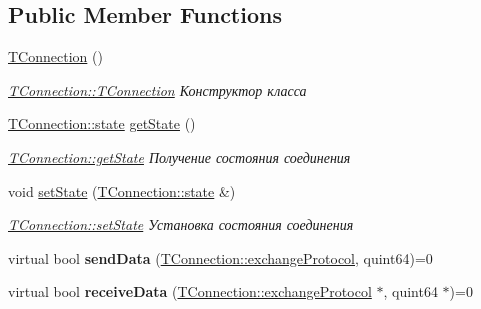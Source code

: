 \subsection*{Public Member Functions}
\begin{DoxyCompactItemize}
\item 
\mbox{\label{classconnection_1_1_t_connection_a2853c8ac857d43657d48c18ceeaef120}} 
\hyperlink{classconnection_1_1_t_connection_a2853c8ac857d43657d48c18ceeaef120}{T\+Connection} ()
\begin{DoxyCompactList}\small\item\em \hyperlink{classconnection_1_1_t_connection_a2853c8ac857d43657d48c18ceeaef120}{T\+Connection\+::\+T\+Connection} Конструктор класса \end{DoxyCompactList}\item 
\hyperlink{classconnection_1_1_t_connection_aee7dfb7510592bd2697ab6f906b9612c}{T\+Connection\+::state} \hyperlink{classconnection_1_1_t_connection_a7944d50c5733279cf0fdfd8c87c3b237}{get\+State} ()
\begin{DoxyCompactList}\small\item\em \hyperlink{classconnection_1_1_t_connection_a7944d50c5733279cf0fdfd8c87c3b237}{T\+Connection\+::get\+State} Получение состояния соединения \end{DoxyCompactList}\item 
void \hyperlink{classconnection_1_1_t_connection_af42c1674b7be3cf7be88806df013860e}{set\+State} (\hyperlink{classconnection_1_1_t_connection_aee7dfb7510592bd2697ab6f906b9612c}{T\+Connection\+::state} \&)
\begin{DoxyCompactList}\small\item\em \hyperlink{classconnection_1_1_t_connection_af42c1674b7be3cf7be88806df013860e}{T\+Connection\+::set\+State} Установка состояния соединения \end{DoxyCompactList}\item 
\mbox{\label{classconnection_1_1_t_connection_ae0cbb8d3bb954f20796d53c704a8359c}} 
virtual bool {\bfseries send\+Data} (\hyperlink{classconnection_1_1_t_connection_a3550181cb2fa72eccfa55d23f45cea34}{T\+Connection\+::exchange\+Protocol}, quint64)=0
\item 
\mbox{\label{classconnection_1_1_t_connection_a2e2fa21e963560dc8836ce94b6e168da}} 
virtual bool {\bfseries receive\+Data} (\hyperlink{classconnection_1_1_t_connection_a3550181cb2fa72eccfa55d23f45cea34}{T\+Connection\+::exchange\+Protocol} $\ast$, quint64 $\ast$)=0
\end{DoxyCompactItemize}
